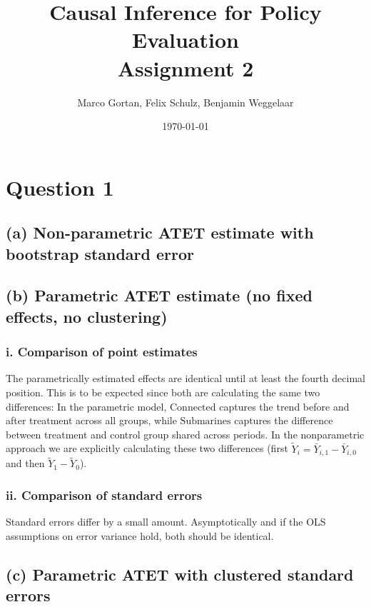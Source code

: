 \documentclass{scrartcl}
\title{Causal Inference for Policy Evaluation\\
\Large{Assignment 2}}
\author{Marco Gortan, Felix Schulz, Benjamin Weggelaar}
\date{\today}
\begin{document}
\maketitle

\section*{Question 1}

\subsection*{(a) Non-parametric ATET estimate with bootstrap standard error}



\subsection*{(b) Parametric ATET estimate (no fixed effects, no clustering)}



\subsubsection*{i. Comparison of point estimates}

The parametrically estimated effects are identical until at least the fourth decimal position. This is to be expected since both are calculating the same two differences: In the parametric model, $\text{Connected}$ captures the trend before and after treatment across all groups, while $\text{Submarines}$ captures the difference between treatment and control group shared across periods. In the nonparametric approach we are explicitly calculating these two differences (first $\tilde{Y}_i = \bar{Y}_{i,1} - \bar{Y}_{i,0}$ and then $\tilde{Y}_1 - \tilde{Y}_0$).

\subsubsection*{ii. Comparison of standard errors}

Standard errors differ by a small amount. Asymptotically and if the OLS assumptions on error variance hold, both should be identical.

\subsection*{(c) Parametric ATET with clustered standard errors}
\end{document}
